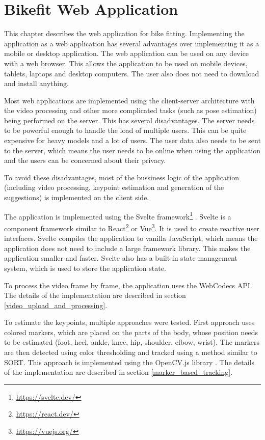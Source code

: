 
\chapter{Bikefit Web Application}
\label{ch:bikefit_application}

This chapter describes the web application for bike fitting. Implementing the application as a web application has several advantages over implementing it as a mobile or desktop application. The web application can be used on any device with a web browser. This allows the application to be used on mobile devices, tablets, laptops and desktop computers. The user also does not need to download and install anything.

Most web applications are implemented using the client-server architecture with the video processing and other more complicated tasks (such as pose estimation) being performed on the server. This has several disadvantages. The server needs to be powerful enough to handle the load of multiple users. This can be quite expensive for heavy models and a lot of users. The user data also needs to be sent to the server, which means the user needs to be online when using the application and the users can be concerned about their privacy.

To avoid these disadvantages, most of the bussiness logic of the application (including video processing, keypoint estimation and generation of the suggestions) is implemented on the client side.

The application is implemented using the Svelte framework\footnote{\url{https://svelte.dev/}} . Svelte is a component framework similar to React\footnote{\url{https://react.dev/}} or Vue\footnote{\url{https://vuejs.org/}}. It is used to create reactive user interfaces. Svelte compiles the application to vanilla JavaScript, which means the application does not need to include a large framework library. This makes the application smaller and faster. Svelte also has a built-in state management system, which is used to store the application state.

To process the video frame by frame, the application uses the WebCodecs API. The details of the implementation are described in section \ref{video_upload_and_processing}.

To estimate the keypoints, multiple approaches were tested. First approach uses colored markers, which are placed on the parts of the body, whose position needs to be estimated (foot, heel, ankle, knee, hip, shoulder, elbow, wrist). The markers are then detected using color thresholding and tracked using a method similar to SORT. This approach is implemented using the OpenCV.js library \cite{opencvjs}. The details of the implementation are described in section \ref{marker_based_tracking}.

